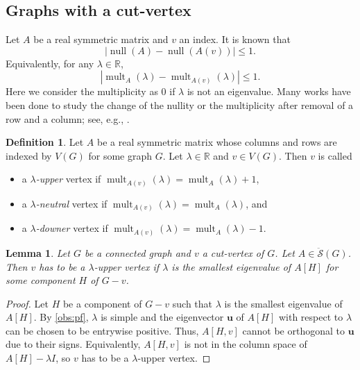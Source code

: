 \documentclass{article}
\newtheorem{lemma}[theorem]{Lemma}
\theoremstyle{definition}
\newtheorem{definition}[theorem]{Definition}
\newcommand{\bu}{\mathbf{u}}
\newcommand{\nul}{\operatorname{null}}
\newcommand{\mdso}{\ddot{\mathcal{S}}}
\newcommand{\mult}{\operatorname{mult}}
\begin{document}
\subsection{Graphs with a cut-vertex}

Let $A$ be a real symmetric matrix and $v$ an index.  It is known that 
\[
    |\nul(A) - \nul(A(v))| \leq 1.
\]
Equivalently, for any $\lambda\in\mathbb{R}$, 
\[
    |\mult_A(\lambda) - \mult_{A(v)}(\lambda)| \leq 1.
\]
Here we consider the multiplicity as $0$ if $\lambda$ is not an eigenvalue.  Many works have been done to study the change of the nullity or the multiplicity after removal of a row and a column; see, e.g., \cite{P1960, W1984, JDS2003, BFH04, SNIP}.  

\begin{definition}
\label{def:und}
Let $A$ be a real symmetric matrix whose columns and rows are indexed by $V(G)$ for some graph $G$.  Let $\lambda\in\mathbb{R}$ and $v\in V(G)$.  Then $v$ is called 
\begin{itemize}
\item a \emph{$\lambda$-upper} vertex if $\mult_{A(v)}(\lambda) = \mult_A(\lambda) + 1$, 
\item a \emph{$\lambda$-neutral} vertex if $\mult_{A(v)}(\lambda) = \mult_A(\lambda)$, and 
\item a \emph{$\lambda$-downer} vertex if $\mult_{A(v)}(\lambda) = \mult_A(\lambda) - 1$. 
\end{itemize}
\end{definition}


\begin{lemma}
\label{lem:minup}
Let $G$ be a connected graph and $v$ a cut-vertex of $G$.  Let $A\in\mdso(G)$.  Then $v$ has to be a $\lambda$-upper vertex if $\lambda$ is the smallest eigenvalue of $A[H]$ for some component $H$ of $G - v$.  
\end{lemma}
\begin{proof}
Let $H$ be a component of $G - v$ such that $\lambda$ is the smallest eigenvalue of $A[H]$.  By \cref{obs:pf}, $\lambda$ is simple and the eigenvector $\bu$ of $A[H]$ with respect to $\lambda$ can be chosen to be entrywise positive.  Thus, $A[H,v]$ cannot be orthogonal to $\bu$ due to their signs.  Equivalently, $A[H,v]$ is not in the column space of $A[H] - \lambda I$, so $v$ has to be a $\lambda$-upper vertex.
\end{proof}
\end{document}
